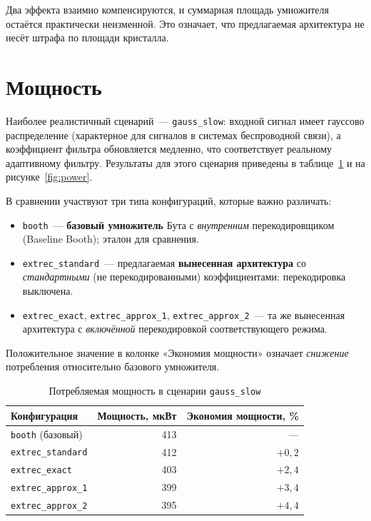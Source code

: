 \documentclass[a4paper, 12pt, oneside]{report}
\begin{document}
Два эффекта взаимно компенсируются, и суммарная площадь умножителя
остаётся практически неизменной. Это означает, что предлагаемая
архитектура не несёт штрафа по площади кристалла.

\section{Мощность}

Наиболее реалистичный сценарий~--- \texttt{gauss\_slow}: входной
сигнал имеет гауссово распределение (характерное для сигналов в системах беспроводной связи),
а коэффициент фильтра обновляется медленно, что соответствует
реальному адаптивному фильтру. Результаты для этого сценария
приведены в таблице~\ref{tab:power} и на рисунке~\ref{fig:power}.

В сравнении участвуют три типа конфигураций, которые важно различать:
\begin{itemize}
  \item \texttt{booth}~--- \textbf{базовый умножитель} Бута с
        \textit{внутренним} перекодировщиком (Baseline Booth); эталон
        для сравнения.
  \item \texttt{extrec\_standard}~--- предлагаемая \textbf{вынесенная
        архитектура} со \textit{стандартными} (не перекодированными)
        коэффициентами: перекодировка выключена.
  \item \texttt{extrec\_exact}, \texttt{extrec\_approx\_1},
        \texttt{extrec\_approx\_2}~--- та же вынесенная архитектура с
        \textit{включённой} перекодировкой соответствующего режима.
\end{itemize}

Положительное значение в колонке «Экономия мощности» означает
\textit{снижение} потребления относительно базового умножителя.

\begin{table}[H]
  \caption{Потребляемая мощность в сценарии \texttt{gauss\_slow}}
  \label{tab:power}
  \centering
  \renewcommand{\arraystretch}{1.3}
  \begin{tabular}{lrr}
    \toprule
    Конфигурация & Мощность, мкВт & Экономия мощности, \% \\
    \midrule
    \texttt{booth} (базовый)           & 413 & --- \\
    \texttt{extrec\_standard}           & 412 & $+0{,}2$ \\
    \texttt{extrec\_exact}             & 403 & $+2{,}4$ \\
    \texttt{extrec\_approx\_1}         & 399 & $+3{,}4$ \\
    \texttt{extrec\_approx\_2}         & 395 & $+4{,}4$ \\
    \bottomrule
  \end{tabular}
\end{table}
\end{document}
